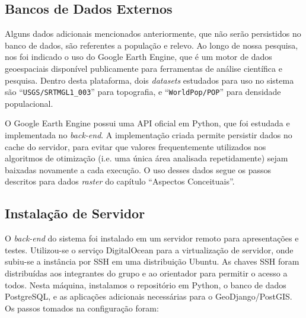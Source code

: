 \documentclass[]{politex}
\begin{document}
\subsection{Bancos de Dados Externos}

Alguns dados adicionais mencionados anteriormente, que não serão persistidos no
banco de dados, são referentes a população e relevo. Ao longo de nossa pesquisa,
nos foi indicado o uso do Google Earth Engine\cite{earthengine}, que é um motor
de dados geoespaciais disponível publicamente para ferramentas de análise
científica e pesquisa. Dentro desta plataforma, dois \textit{datasets} estudados
para uso no sistema são ``\texttt{USGS/SRTMGL1\_003}'' para topografia, e
``\texttt{WorldPop/POP}'' para densidade populacional.

O Google Earth Engine possui uma API oficial em Python, que foi estudada e
implementada no \textit{back-end}. A implementação criada permite persistir
dados no cache do servidor, para evitar que valores frequentemente utilizados
nos algoritmos de otimização (i.e. uma única área analisada repetidamente) sejam
baixadas novamente a cada execução. O uso desses dados segue os passos descritos
para dados \textit{raster} do capítulo ``Aspectos Conceituais''.

\subsection{Instalação de Servidor}

O \textit{back-end} do sistema foi instalado em um servidor remoto para
apresentações e testes. Utilizou-se o serviço DigitalOcean para a virtualização
de servidor, onde subiu-se a instância por SSH em uma distribuição Ubuntu. As
chaves SSH foram distribuídas aos integrantes do grupo e ao orientador para
permitir o acesso a todos. Nesta máquina, instalamos o repositório em Python, o
banco de dados PostgreSQL, e as aplicações adicionais necessárias para o
GeoDjango/PostGIS. Os passos tomados na configuração foram:
\end{document}
